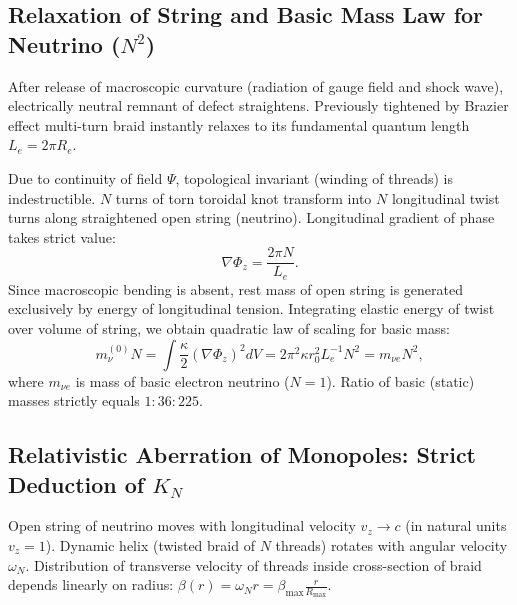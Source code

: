 \documentclass[12pt,a4paper]{article}
\begin{document}
\subsection{Relaxation of String and Basic Mass Law for Neutrino ($N^2$)}
After release of macroscopic curvature (radiation of gauge field and shock wave), electrically neutral remnant of defect straightens. Previously tightened by Brazier effect multi-turn braid instantly relaxes to its fundamental quantum length $L_e = 2\pi R_e$.

Due to continuity of field $\Psi$, topological invariant (winding of threads) is indestructible. $N$ turns of torn toroidal knot transform into $N$ longitudinal twist turns along straightened open string (neutrino). Longitudinal gradient of phase takes strict value:
\begin{equation}
    \nabla\Phi_z = \frac{2\pi N}{L_e}.
    \label{eq:phase_gradient_neutrino}
\end{equation}
Since macroscopic bending is absent, rest mass of open string is generated exclusively by energy of longitudinal tension. Integrating elastic energy of twist over volume of string, we obtain quadratic law of scaling for basic mass:
\begin{equation}
    m^{(0)}_\nu N = \int \frac{\kappa}{2} (\nabla\Phi_z)^2 dV = 2\pi^2 \kappa r_0^2 L_e^{-1} N^2 = m_{\nu e} N^2,
    \label{eq:neutrino_mass_n2}
\end{equation}
where $m_{\nu e}$ is mass of basic electron neutrino ($N=1$). Ratio of basic (static) masses strictly equals $1 : 36 : 225$.

\subsection{Relativistic Aberration of Monopoles: Strict Deduction of $K_N$}
Open string of neutrino moves with longitudinal velocity $v_z \to c$ (in natural units $v_z=1$). Dynamic helix (twisted braid of $N$ threads) rotates with angular velocity $\omega_N$. Distribution of transverse velocity of threads inside cross-section of braid depends linearly on radius: $\beta(r) = \omega_N r = \beta_{\text{max}} \frac{r}{R_{\text{max}}}$.
\end{document}
